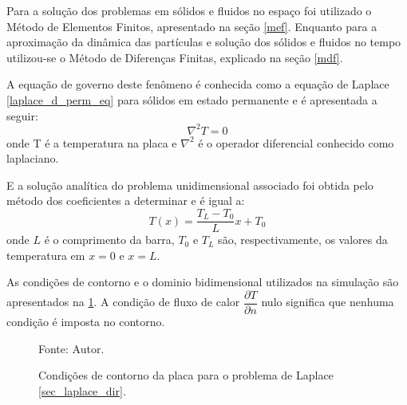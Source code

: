 Para a solução dos problemas em sólidos e fluidos no espaço foi utilizado o Método de Elementos Finitos, apresentado na seção \ref{mef}.
Enquanto para a aproximação da dinâmica das partículas e solução dos sólidos e fluidos no tempo utilizou-se o Método de Diferenças Finitas, explicado na seção \ref{mdf}.

A equação de governo deste fenômeno é conhecida como a equação de Laplace \eqref{laplace_d_perm_eq} para sólidos em estado permanente e é apresentada a seguir:
\begin{equation}
    \nabla^2 T = 0
    \label{laplace_d_perm_eq} 
\end{equation}
onde T é a temperatura na placa e $\nabla^2$ é o operador diferencial conhecido como laplaciano.

E a solução analítica do problema unidimensional associado foi obtida pelo método dos coeficientes a determinar e é igual a:
\begin{equation}
    T(x) = \dfrac{T_L-T_0}{L} x + T_0
    \label{laplace_d_sol}
\end{equation}
onde $L$ é o comprimento da barra, $T_0$ e $T_L$ são, respectivamente, os valores da temperatura em $x=0$ e $x=L$.

As condições de contorno e o dominio bidimensional utilizados na simulação são apresentados na \ref{laplace_d_bc}. A condição de fluxo de calor $\dfrac{\partial T}{\partial n}$ nulo significa que nenhuma condição é imposta no contorno.

\begin{figure}[H]
    \centering
     {\raggedleft \scriptsize Fonte: Autor.}
    \caption{Condições de contorno da placa para o problema de Laplace \ref{sec_laplace_dir}.}
    \label{laplace_d_bc}
\end{figure}

